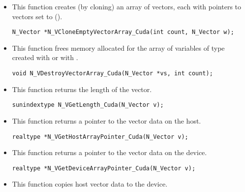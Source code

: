 \begin{itemize}

\item {}
 
  This function creates (by cloning) an array of  {\nveccuda} vectors,
  each with pointers to {\cuda} vectors set to ().
 
\begin{verbatim}
N_Vector *N_VCloneEmptyVectorArray_Cuda(int count, N_Vector w);
\end{verbatim}


\item {}
 
 This function frees memory allocated for the array of  variables of
 type  created with  or with
 .
 

 \verb|void N_VDestroyVectorArray_Cuda(N_Vector *vs, int count);|


\item {}
 
 This function returns the length of the vector.

 \verb|sunindextype N_VGetLength_Cuda(N_Vector v);|


\item {}
 
 This function returns a pointer to the vector data on the host.

 \verb|realtype *N_VGetHostArrayPointer_Cuda(N_Vector v);|



\item {}
 
 This function returns a pointer to the vector data on the device.

 \verb|realtype *N_VGetDeviceArrayPointer_Cuda(N_Vector v);|



\item {}
 
 This function copies host vector data to the device.


\end{itemize}
